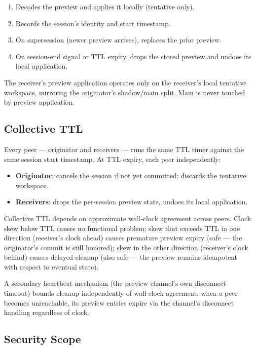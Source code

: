 \begin{enumerate}
    \item Decodes the preview and applies it locally (tentative only).
    \item Records the session's identity and start timestamp.
    \item On supersession (newer preview arrives), replaces the prior preview.
    \item On session-end signal or TTL expiry, drops the stored preview and undoes its local application.
\end{enumerate}

The receiver's preview application operates only on the receiver's local tentative workspace, mirroring the originator's shadow/main split. Main is never touched by preview application.

\subsection{Collective TTL}

Every peer --- originator and receivers --- runs the same TTL timer against the same session start timestamp. At TTL expiry, each peer independently:

\begin{itemize}
    \item \textbf{Originator}: cancels the session if not yet committed; discards the tentative workspace.
    \item \textbf{Receivers}: drops the per-session preview state, undoes its local application.
\end{itemize}

Collective TTL depends on approximate wall-clock agreement across peers. Clock skew below TTL causes no functional problem; skew that exceeds TTL in one direction (receiver's clock ahead) causes premature preview expiry (safe --- the originator's commit is still honored); skew in the other direction (receiver's clock behind) causes delayed cleanup (also safe --- the preview remains idempotent with respect to eventual state).

A secondary heartbeat mechanism (the preview channel's own disconnect timeout) bounds cleanup independently of wall-clock agreement: when a peer becomes unreachable, its preview entries expire via the channel's disconnect handling regardless of clock.

\subsection{Security Scope}

